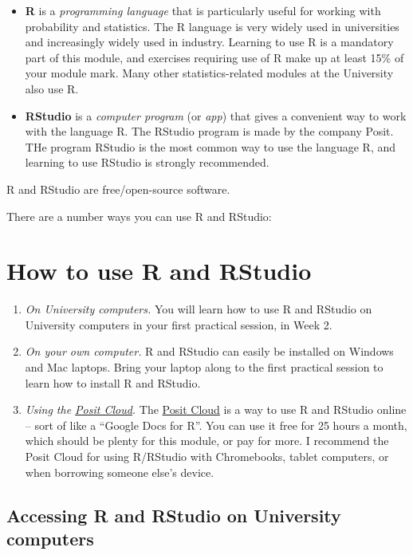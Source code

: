 \documentclass[
  a4paper,
]{book}
\providecommand{\tightlist}{%
  \setlength{\itemsep}{0pt}\setlength{\parskip}{0pt}}
\theoremstyle{definition}
\theoremstyle{definition}
\theoremstyle{definition}
\theoremstyle{definition}
\theoremstyle{remark}
\begin{document}
\begin{itemize}
\tightlist
\item
  \textbf{R} is a \emph{programming language} that is particularly useful for working with probability and statistics. The R language is very widely used in universities and increasingly widely used in industry. Learning to use R is a mandatory part of this module, and exercises requiring use of R make up at least 15\% of your module mark. Many other statistics-related modules at the University also use R.
\item
  \textbf{RStudio} is a \emph{computer program} (or \emph{app}) that gives a convenient way to work with the language R. The RStudio program is made by the company Posit. THe program RStudio is the most common way to use the language R, and learning to use RStudio is strongly recommended.
\end{itemize}

R and RStudio are free/open-source software.

There are a number ways you can use R and RStudio:

\hypertarget{how-to-use-r-and-rstudio}{%
\section*{How to use R and RStudio}\label{how-to-use-r-and-rstudio}}

\begin{enumerate}
\def\labelenumi{\arabic{enumi}.}
\item
  \emph{On University computers.} You will learn how to use R and RStudio on University computers in your first practical session, in Week 2.
\item
  \emph{On your own computer.} R and RStudio can easily be installed on Windows and Mac laptops. Bring your laptop along to the first practical session to learn how to install R and RStudio.
\item
  \emph{Using the \href{https://posit.cloud}{Posit Cloud}.} The \href{https://posit.cloud}{Posit Cloud} is a way to use R and RStudio online -- sort of like a ``Google Docs for R''. You can use it free for 25 hours a month, which should be plenty for this module, or pay for more. I recommend the Posit Cloud for using R/RStudio with Chromebooks, tablet computers, or when borrowing someone else's device.
\end{enumerate}

\hypertarget{r-uni}{%
\subsection*{Accessing R and RStudio on University computers}\label{r-uni}}
\end{document}
